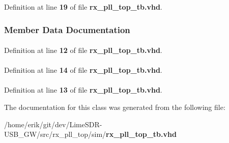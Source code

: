Definition at line {\bf 19} of file {\bf rx\+\_\+pll\+\_\+top\+\_\+tb.\+vhd}.



\subsubsection{Member Data Documentation}
\paragraph[{ieee}]{\hspace{0.3cm}{\ttfamily [Library]}}\label{classrx__pll__top__tb_a0a6af6eef40212dbaf130d57ce711256}


Definition at line {\bf 12} of file {\bf rx\+\_\+pll\+\_\+top\+\_\+tb.\+vhd}.

\paragraph[{numeric\+\_\+std}]{\hspace{0.3cm}{\ttfamily [Package]}}\label{classrx__pll__top__tb_a2edc34402b573437d5f25fa90ba4013e}


Definition at line {\bf 14} of file {\bf rx\+\_\+pll\+\_\+top\+\_\+tb.\+vhd}.

\paragraph[{std\+\_\+logic\+\_\+1164}]{\hspace{0.3cm}{\ttfamily [Package]}}\label{classrx__pll__top__tb_acd03516902501cd1c7296a98e22c6fcb}


Definition at line {\bf 13} of file {\bf rx\+\_\+pll\+\_\+top\+\_\+tb.\+vhd}.



The documentation for this class was generated from the following file\+:\begin{DoxyCompactItemize}
\item 
/home/erik/git/dev/\+Lime\+S\+D\+R-\/\+U\+S\+B\+\_\+\+G\+W/src/rx\+\_\+pll\+\_\+top/sim/{\bf rx\+\_\+pll\+\_\+top\+\_\+tb.\+vhd}\end{DoxyCompactItemize}
